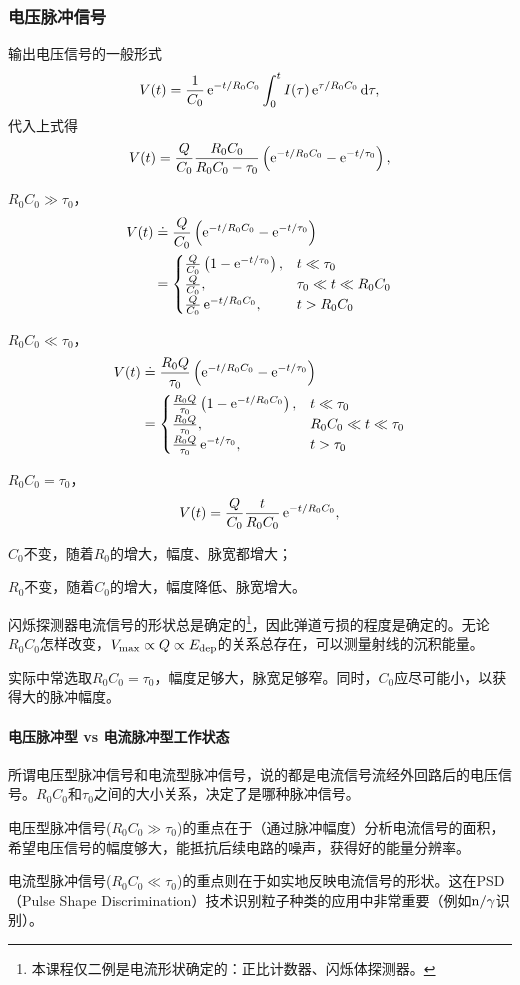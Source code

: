 \subsubsection{电压脉冲信号}
输出电压信号的一般形式
\[
	V(t)=\frac1{C_0}\mathop{}\!\mathrm{e}^{-t/R_0C_0}\int_0^tI(\tau)\mathop{}\!\mathrm{e}^{\tau/R_0C_0}\mathop{}\!\mathrm{d}\tau,
\]
代入上式得
\[
	V(t)=\frac Q{C_0}\frac{R_0C_0}{R_0C_0-\tau_0}\left(\mathop{}\!\mathrm{e}^{-t/R_0C_0}-\mathop{}\!\mathrm{e}^{-t/\tau_0}\right),
\]
\begin{compactitem}
	\item $R_0C_0\gg\tau_0$，
	\begin{align*}
		V(t)&\doteq\frac Q{C_0}\left(\mathop{}\!\mathrm{e}^{-t/R_0C_0}-\mathop{}\!\mathrm{e}^{-t/\tau_0}\right)\\
		&=\begin{cases}
			\frac Q{C_0}\left(1-\mathop{}\!\mathrm{e}^{-t/\tau_0}\right),&t\ll\tau_0\\
			\frac Q{C_0},&\tau_0\ll t\ll R_0C_0\\
			\frac Q{C_0}\mathop{}\!\mathrm{e}^{-t/R_0C_0},&t>R_0C_0
		\end{cases}
	\end{align*}
	\item $R_0C_0\ll\tau_0$，
	\begin{align*}
		V(t)&\doteq\frac{R_0Q}{\tau_0}\left(\mathop{}\!\mathrm{e}^{-t/R_0C_0}-\mathop{}\!\mathrm{e}^{-t/\tau_0}\right)\\
		&=\begin{cases}
			\frac{R_0Q}{\tau_0}\left(1-\mathop{}\!\mathrm{e}^{-t/R_0C_0}\right),&t\ll\tau_0\\
			\frac {R_0Q}{\tau_0},&R_0C_0\ll t\ll \tau_0\\
			\frac {R_0Q}{\tau_0}\mathop{}\!\mathrm{e}^{-t/\tau_0},&t>\tau_0
		\end{cases}
	\end{align*}
	\item $R_0C_0=\tau_0$，
	\[
		V(t)=\frac{Q}{C_0}\frac{t}{R_0C_0}\mathop{}\!\mathrm{e}^{-t/R_0C_0},
	\]
	
	\item $C_0$不变，随着$R_0$的增大，幅度、脉宽都增大；
	\item $R_0$不变，随着$C_0$的增大，幅度降低、脉宽增大。
\end{compactitem}

闪烁探测器电流信号的形状总是确定的\footnote{本课程仅二例是电流形状确定的：正比计数器、闪烁体探测器。}，因此弹道亏损的程度是确定的。无论$R_0C_0$怎样改变，$V_\mathrm{max}\propto Q\propto E_{\mathrm{dep}}$的关系总存在，可以测量射线的沉积能量。

实际中常选取$R_0C_0=\tau_0$，幅度足够大，脉宽足够窄。同时，$C_0$应尽可能小，以获得大的脉冲幅度。
\paragraph{电压脉冲型 vs 电流脉冲型工作状态}
所谓电压型脉冲信号和电流型脉冲信号，说的都是电流信号流经外回路后的电压信号。$R_0C_0$和$\tau_0$之间的大小关系，决定了是哪种脉冲信号。
\begin{compactitem}
	\item 电压型脉冲信号($R_0C_0\gg\tau_0$)的重点在于（通过脉冲幅度）分析电流信号的面积，希望电压信号的幅度够大，能抵抗后续电路的噪声，获得好的能量分辨率。
	\item 电流型脉冲信号($R_0C_0\ll\tau_0$)的重点则在于如实地反映电流信号的形状。这在PSD（Pulse Shape Discrimination）技术识别粒子种类的应用中非常重要（例如$\mathrm n/\gamma$识别）。
\end{compactitem}
